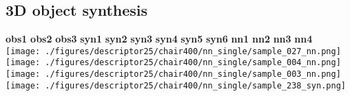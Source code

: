\documentclass[10pt,twocolumn,letterpaper]{article}
\begin{document}


\subsection{3D object synthesis} 
\label{Exp:objectSynthesis}

\begin{figure*}[h]
	\centering	
\textbf{{\footnotesize obs1}}\hspace{6mm} \textbf{{\footnotesize obs2}} \hspace{6mm} \textbf{{\footnotesize obs3}} \hspace{6mm} \textbf{{\footnotesize syn1}} \hspace{6mm} \textbf{{\footnotesize syn2}} \hspace{6mm} \textbf{{\footnotesize syn3}} \hspace{6mm} \textbf{{\footnotesize syn4}} \hspace{6mm}
\textbf{{\footnotesize syn5}} \hspace{6mm} \textbf{{\footnotesize syn6}} \hspace{6mm} \textbf{{\footnotesize nn1}} \hspace{6mm}
\textbf{{\footnotesize nn2}} \hspace{6mm} \textbf{{\footnotesize nn3}} \hspace{6mm}
\textbf{{\footnotesize nn4}} \\
	\texttt{[image: ./figures/descriptor25/chair400/nn\_single/sample\_027\_nn.png]} \hspace{-3mm} 
	\texttt{[image: ./figures/descriptor25/chair400/nn\_single/sample\_004\_nn.png]} \hspace{-3mm} 
	\texttt{[image: ./figures/descriptor25/chair400/nn\_single/sample\_003\_nn.png]} \hspace{-3mm}
    \texttt{[image: ./figures/descriptor25/chair400/nn\_single/sample\_238\_syn.png]} \hspace{-3mm}	

\end{figure*}
\end{document}
